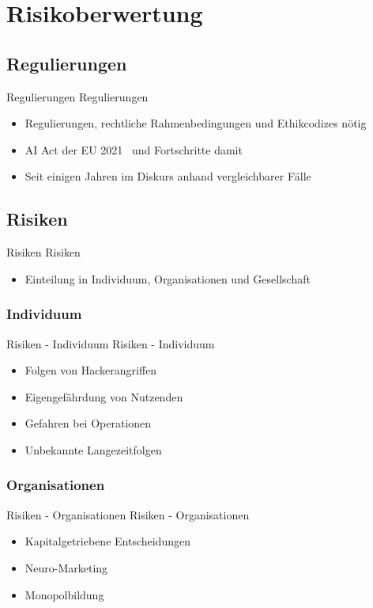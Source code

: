 \documentclass[aspectratio=169,16pt,xcolor=table]{beamer}
\begin{document}
\section{Risikoberwertung}
\subsection{Regulierungen}
\begin{frame}{Regulierungen}
Regulierungen
	\begin{itemize}
		\item{Regulierungen, rechtliche Rahmenbedingungen und Ethikcodizes nötig}
		\item{AI Act der EU 2021~\cite{ai_act_eu_2021} und Fortschritte damit~\cite{ai_act_deal_2023}}
		\item{Seit einigen Jahren im Diskurs anhand vergleichbarer Fälle~\cite{lee2016cochlear}}
	\end{itemize}
\end{frame}

\subsection{Risiken}
\begin{frame}{Risiken}
Risiken
	\begin{itemize}
		\item{Einteilung in Individuum, Organisationen und Gesellschaft}
	\end{itemize}
\end{frame}

\subsubsection{Individuum}
\begin{frame}{Risiken - Individuum}
Risiken - Individuum
	\begin{itemize}
		\item{Folgen von Hackerangriffen~\cite{khan_aziz_2019}}
		\item{Eigengefährdung von Nutzenden~\cite{khan_aziz_2019}}
		\item{Gefahren bei Operationen~\cite{Burwell:2017aa}}
		\item{Unbekannte Langezeitfolgen~\cite{Burwell:2017aa}}
	\end{itemize}
\end{frame}

\subsubsection{Organisationen}
\begin{frame}{Risiken - Organisationen}
Risiken - Organisationen
	\begin{itemize}
		\item{Kapitalgetriebene Entscheidungen~\cite{khan_aziz_2019}}
		\item{Neuro-Marketing~\cite{khan_aziz_2019}}
		\item{Monopolbildung~\cite{khan_aziz_2019}}
	\end{itemize}
\end{frame}
\end{document}
